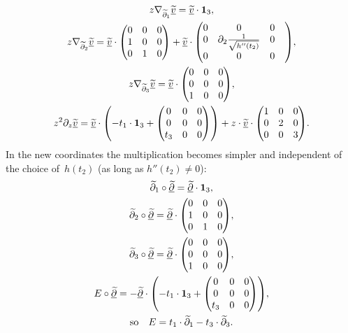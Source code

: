 \documentclass[pdftex]{sigma}%
\numberwithin{equation}{section}
\numberwithin{figure}{section}
\newcommand{\www}{\widetilde}
\newcommand{\uuuu}{\underline}
\newcommand{\paa}{\partial}
\newcommand{\nnn}{\nabla}
\begin{document}
\begin{gather*}%
z\nnn_{\www\paa_1}\uuuu{\www v}=\uuuu{\www v}\cdot {\bf 1}_3,
\\
z\nnn_{\www\paa_2}\uuuu{\www v}=\uuuu{\www v}\cdot
\begin{pmatrix}0&0&0\\1&0&0\\0&1&0\end{pmatrix}
+\uuuu{\www v}\cdot
\begin{pmatrix}0&0&0\\0&\paa_2\frac{1}{\sqrt{h''(t_2)}}&0
\\
0&0&0&\end{pmatrix}\!,
\\
z\nnn_{\www\paa_3}\uuuu{\www v}=\uuuu{\www v}\cdot
\begin{pmatrix}0&0&0\\0&0&0\\1&0&0\end{pmatrix}\!,
\\
z^2\paa_z\uuuu{\www v}=\uuuu{\www v}\cdot
\left(-t_1\cdot {\bf 1}_3
+\begin{pmatrix}0&0&0\\0&0&0\\t_3&0&0\end{pmatrix}\right)
+z\cdot\uuuu{\www v}\cdot
\begin{pmatrix}1&0&0\\0&2&0\\0&0&3\end{pmatrix}\!.\nonumber
\end{gather*}
In the new coordinates the multiplication becomes simpler
and independent of the choice of~$h(t_2)$ (as long as
$h''(t_2)\neq 0$):
\begin{gather*}%
\www\paa_1\circ\uuuu{\www\paa}=\uuuu{\www\paa}\cdot {\bf 1}_3,
\\
\www\paa_2\circ\uuuu{\www\paa}=\uuuu{\www\paa}\cdot
\begin{pmatrix}0&0&0\\1&0&0\\0&1&0\end{pmatrix}\!,
\\
\www\paa_3\circ\uuuu{\www\paa}= \uuuu{\www\paa}\cdot
\begin{pmatrix}0&0&0\\0&0&0\\1&0&0\end{pmatrix}\!,
\\
E\circ\uuuu{\www\paa}= -\uuuu{\www\paa}\cdot\left({-}t_1\cdot {\bf 1}_3
+\begin{pmatrix}0&0&0\\0&0&0\\t_3&0&0\end{pmatrix}\right)\!,
\\
\text{so}\quad E= t_1\cdot\www\paa_1-t_3\cdot\www\paa_3.
\end{gather*}
\end{document}
